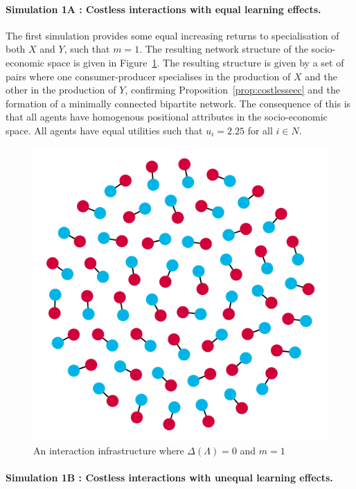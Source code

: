 \paragraph{Simulation 1A : Costless interactions with equal learning effects.}

The first simulation provides some equal increasing returns to specialisation of both $X$ and $Y$, such that $m = 1$. The resulting network structure of the socio-economic space is given in Figure~\ref{Sim1}. The resulting structure is given by a set of pairs where one consumer-producer specialises in the production of $X$ and the other in the production of $Y$, confirming Proposition~\ref{prop:costlesseec} and the formation of a minimally connected bipartite network. The consequence of this is that all agents have homogenous positional attributes in the socio-economic space. All agents have equal utilities such that $u_{i} = 2.25$ for all $i \in N$.

\begin{figure}[t]
\centering
\includegraphics[scale=0.22]{Images/Sim1E.png}
\caption{An interaction infrastructure where $\Delta(\Lambda)=0$ and $m=1$}
\label{Sim1}
\end{figure}

\paragraph{Simulation 1B : Costless interactions with unequal learning effects.}

